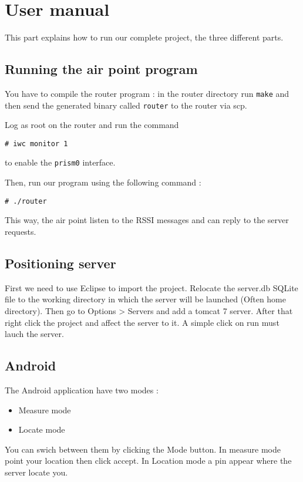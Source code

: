 \section{User manual}

This part explains how to run our complete project, the three different parts.

\subsection{Running the air point program}

You have to compile the router program : in the router directory run \verb+make+
and then send the generated binary called \verb+router+ to the router via scp.

Log as root on the router and run the command 

\verb+# iwc monitor 1+

to enable the \verb+prism0+ interface.

Then, run our program using the following command :

\verb+# ./router+

This way, the air point listen to the RSSI messages and can reply to the server
requests.


\subsection{Positioning server}

First we need to use Eclipse to import the project. Relocate the server.db SQLite file to the working directory in which the server will be launched (Often home directory).
Then go to Options > Servers and add a tomcat 7 server.
After that right click the project and affect the server to it. A simple click on run must lauch the server.


\subsection{Android}

The Android application have two modes :
\begin{itemize}
    \item Measure mode
    \item Locate mode
\end{itemize}
You can swich between them by clicking the Mode button. In measure mode point your location then click accept.
In Location mode a pin appear where the server locate you.
